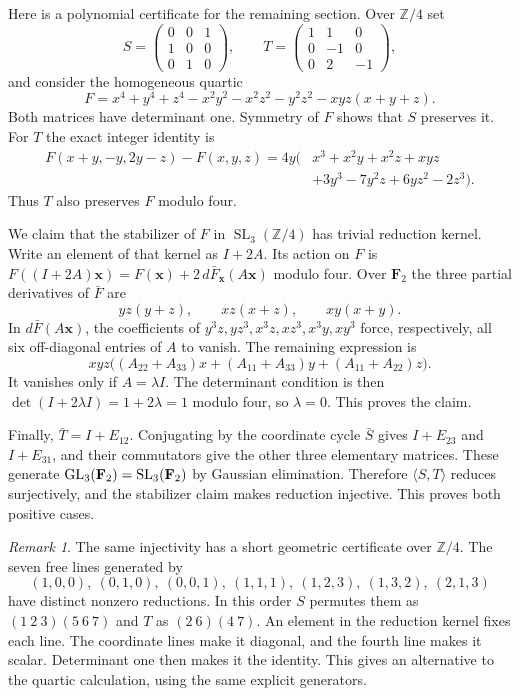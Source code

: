\documentclass[11pt]{article}
\DeclareMathOperator{\SL}{SL}\DeclareMathOperator{\Sp}{Sp}
\theoremstyle{definition}\newtheorem{definition}[theorem]{Definition}
\theoremstyle{remark}\newtheorem{remark}[theorem]{Remark}
\begin{document}
Here is a polynomial certificate for the remaining section. Over
$\mathbb Z/4$ set
\[
 S=\begin{pmatrix}0&0&1\\1&0&0\\0&1&0\end{pmatrix},\qquad
 T=\begin{pmatrix}1&1&0\\0&-1&0\\0&2&-1\end{pmatrix},
\]
and consider the homogeneous quartic
\[
 F=x^4+y^4+z^4-x^2y^2-x^2z^2-y^2z^2-xyz(x+y+z).
\]
Both matrices have determinant one. Symmetry of $F$ shows that $S$
preserves it. For $T$ the exact integer identity is
\begin{align*}
 F(x+y,-y,2y-z)-F(x,y,z)
  =4y\bigl(&x^3+x^2y+x^2z+xyz\\
            &+3y^3-7y^2z+6yz^2-2z^3\bigr).
\end{align*}
Thus $T$ also preserves $F$ modulo four.

We claim that the stabilizer of $F$ in $\SL_3(\mathbb Z/4)$ has trivial
reduction kernel. Write an element of that kernel as $I+2A$. Its action
on $F$ is
$F((I+2A)\mathbf x)=F(\mathbf x)+2\,d\bar F_{\mathbf x}(A\mathbf x)$
modulo four. Over $\mathbf F_2$ the three partial derivatives of $\bar F$
are
\[
 yz(y+z),\qquad xz(x+z),\qquad xy(x+y).
\]
In $d\bar F(A\mathbf x)$, the coefficients of
$y^3z,yz^3,x^3z,xz^3,x^3y,xy^3$ force, respectively, all six
off-diagonal entries of $A$ to vanish. The remaining expression is
\[
 xyz\bigl((A_{22}+A_{33})x+(A_{11}+A_{33})y
                         +(A_{11}+A_{22})z\bigr).
\]
It vanishes only if $A=\lambda I$. The determinant condition is then
$\det(I+2\lambda I)=1+2\lambda=1$ modulo four, so $\lambda=0$.
This proves the claim.

Finally, $\bar T=I+E_{12}$. Conjugating by the coordinate cycle $\bar S$
gives $I+E_{23}$ and $I+E_{31}$, and their commutators give the other
three elementary matrices. These generate
$\GL_3(\mathbf F_2)=\SL_3(\mathbf F_2)$ by Gaussian elimination.
Therefore $\langle S,T\rangle$ reduces surjectively, and the stabilizer
claim makes reduction injective. This proves both positive cases.

\begin{remark}\label{rem:seven-lines}
The same injectivity has a short geometric certificate over $\mathbb Z/4$.
The seven free lines generated by
\[
 (1,0,0),\ (0,1,0),\ (0,0,1),\ (1,1,1),\
 (1,2,3),\ (1,3,2),\ (2,1,3)
\]
have distinct nonzero reductions. In this order $S$ permutes them as
$(1\ 2\ 3)(5\ 6\ 7)$ and $T$ as $(2\ 6)(4\ 7)$.
An element in the reduction kernel fixes each line. The coordinate lines
make it diagonal, and the fourth line makes it scalar. Determinant one
then makes it the identity. This gives an alternative to the quartic
calculation, using the same explicit generators.
\end{remark}
\end{document}
